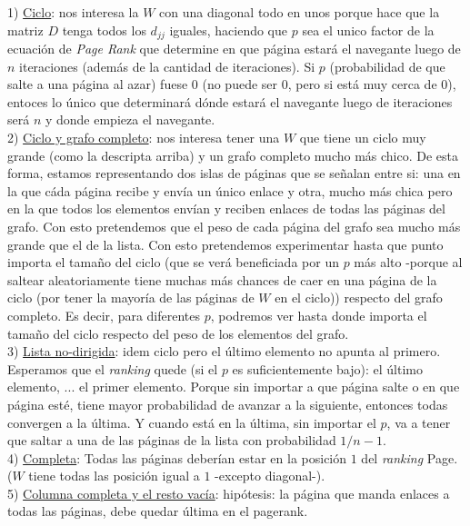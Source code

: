 			1) \underline{Ciclo}: nos interesa la $W$ con una diagonal todo en unos porque hace que la matriz $D$ tenga todos los $d_{jj}$ iguales, haciendo que $p$ sea el unico factor de la ecuación de \textit{Page Rank} que determine en que página estará el navegante luego de $n$ iteraciones (además de la cantidad de iteraciones). Si $p$ (probabilidad de que salte a una página al azar) fuese $0$ (no puede ser $0$, pero si está muy cerca de $0$), entoces lo único que determinará dónde estará el navegante luego de iteraciones será $n$ y donde empieza el navegante. \\

			2) \underline{Ciclo y grafo completo}: nos interesa tener una $W$ que tiene un ciclo muy grande (como la descripta arriba) y un grafo completo mucho más chico. De esta forma, estamos representando dos islas de páginas que se señalan entre si: una en la que cáda página recibe y envía un único enlace y otra, mucho más chica pero en la que todos los elementos envían y reciben enlaces de todas las páginas del grafo. Con esto pretendemos que el peso de cada página del grafo sea mucho más grande que el de la lista. Con esto pretendemos experimentar hasta que punto importa el tamaño del ciclo (que se verá beneficiada por un $p$ más alto -porque al saltear aleatoriamente tiene muchas más chances de caer en una página de la ciclo (por tener la mayoría de las páginas de $W$ en el ciclo)) respecto del grafo completo. Es decir, para diferentes $p$, podremos ver hasta donde importa el tamaño del ciclo respecto del peso de los elementos del grafo. \\

			3) \underline{Lista no-dirigida}: idem ciclo pero el último elemento no apunta al primero. Esperamos que el \textit{ranking} quede (si el $p$ es suficientemente bajo): el último elemento, ... el primer elemento. Porque sin importar a que página salte o en que página esté, tiene mayor probabilidad de avanzar a la siguiente, entonces todas convergen a la última. Y cuando está en la última, sin importar el $p$, va a tener que saltar a una de las páginas de la lista con probabilidad $1/n-1$.\\

			4) \underline{Completa}: Todas las páginas deberían estar en la posición $1$ del \textit{ranking} Page. ($W$ tiene todas las posición igual a $1$ -excepto diagonal-).\\

			5) \underline{Columna completa y el resto vacía}: hipótesis: la página que manda enlaces a todas las páginas, debe quedar última en el pagerank.


